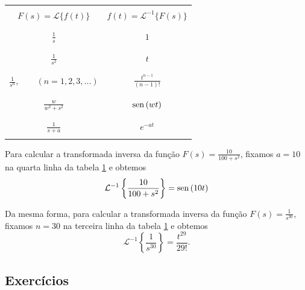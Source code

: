 \begin{table}
\begin{small}
\begin{center}
\begin{tabular}{|c|c|}
\hline &\\
$\displaystyle F(s)=\mathcal{L }\{f(t)\} $&$\displaystyle  f(t)=\mathcal{L }^{-1}\{F(s)\}$ \\ &\\
\hline &\\
$\displaystyle \frac{1}{s} $&$\displaystyle  1$ \\ &\\
\hline &\\
$\displaystyle \frac{1}{s^2} $&$\displaystyle  t$ \\ &\\
\hline &\\
$\displaystyle \frac{1}{s^n}, \qquad (n=1,2,3,...) $&$\displaystyle  \frac{t^{n-1}}{(n-1)!}$ \\ &\\
\hline &\\
$\displaystyle \frac{w}{w^2+s^2} $&$\displaystyle  \operatorname{sen}\,(wt)$ \\ &\\
\hline &\\
$\displaystyle \frac{1}{s+a} $&$\displaystyle  e^{ -at}$ \\ &\\
\hline
\end{tabular}
\caption{\label{tab_1}}
\end{center}
\end{small}
\end{table}
\begin{ex}Para calcular a transformada inversa da função $F(s)=\frac{10}{100+s^2}$, fixamos $a=10$ na quarta linha da tabela \ref{tab_1} e obtemos
\begin{equation}
\mathcal{L }^{-1}\left\{ \frac{10}{100+s^2}\right\}=\operatorname{sen}\,(10t)
\end{equation}
\end{ex}
\begin{ex}Da mesma forma, para calcular a transformada inversa da função $F(s)=\frac{1}{s^{30}}$, fixamos $n=30$ na terceira linha da tabela \ref{tab_1} e obtemos
\begin{equation}
\mathcal{L }^{-1}\left\{ \frac{1}{s^{30}}\right\}=\frac{t^{29}}{29!}.
\end{equation}
\end{ex}
\subsection*{Exercícios}

